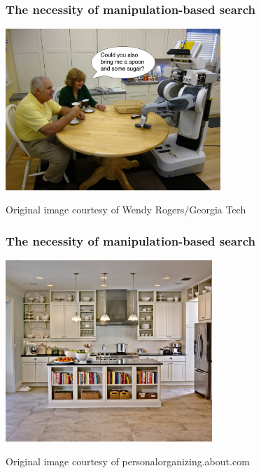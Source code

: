 \begin{frame}
  \frametitle{The necessity of manipulation-based search}
  \begin{center}
    \includegraphics[width=3.2in]{img/robot_in_kitchen.jpg}

    \tiny{Original image courtesy of Wendy Rogers/Georgia Tech}
  \end{center}
\end{frame}

\begin{frame}
  \frametitle{The necessity of manipulation-based search}
  \begin{center}
    \includegraphics[height=2.7in]{img/kitchen-organization-fake.jpg}

    \tiny{Original image courtesy of personalorganizing.about.com}
  \end{center}
\end{frame}

